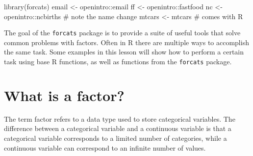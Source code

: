 \documentclass[
  letterpaper,
  DIV=11,
  numbers=noendperiod,
  oneside]{scrreprt}
\newenvironment{Shaded}{\begin{snugshade}}{\end{snugshade}}
\newcommand{\CommentTok}[1]{\textcolor[rgb]{0.37,0.37,0.37}{#1}}
\newcommand{\FunctionTok}[1]{\textcolor[rgb]{0.28,0.35,0.67}{#1}}
\newcommand{\NormalTok}[1]{\textcolor[rgb]{0.00,0.23,0.31}{#1}}
\newcommand{\OtherTok}[1]{\textcolor[rgb]{0.00,0.23,0.31}{#1}}
\newcommand{\SpecialCharTok}[1]{\textcolor[rgb]{0.37,0.37,0.37}{#1}}
\begin{document}
{} {} {}

\begin{Shaded}
\begin{Highlighting}[]
\FunctionTok{library}\NormalTok{(forcats)}
\NormalTok{email }\OtherTok{\textless{}{-}}\NormalTok{ openintro}\SpecialCharTok{::}\NormalTok{email}
\NormalTok{ff    }\OtherTok{\textless{}{-}}\NormalTok{ openintro}\SpecialCharTok{::}\NormalTok{fastfood}
\NormalTok{nc    }\OtherTok{\textless{}{-}}\NormalTok{ openintro}\SpecialCharTok{::}\NormalTok{ncbirths }\CommentTok{\# note the name change}
\NormalTok{mtcars }\OtherTok{\textless{}{-}}\NormalTok{ mtcars }\CommentTok{\# comes with R}
\end{Highlighting}
\end{Shaded}

The goal of the \texttt{forcats} package is to provide a suite of useful
tools that solve common problems with factors. Often in R there are
multiple ways to accomplish the same task. Some examples in this lesson
will show how to perform a certain task using base R functions, as well
as functions from the \texttt{forcats} package.

\section{What is a factor?}\label{what-is-a-factor}

The term factor refers to a data type used to store categorical
variables. The difference between a categorical variable and a
continuous variable is that a categorical variable corresponds to a
limited number of categories, while a continuous variable can correspond
to an infinite number of values.
\end{document}
